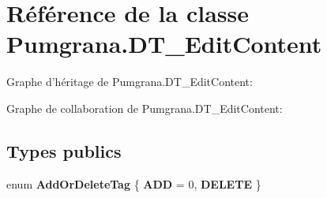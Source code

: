 \hypertarget{class_pumgrana_1_1_d_t___edit_content}{\section{Référence de la classe Pumgrana.\+D\+T\+\_\+\+Edit\+Content}
\label{class_pumgrana_1_1_d_t___edit_content}
}


Graphe d'héritage de Pumgrana.\+D\+T\+\_\+\+Edit\+Content\+:


Graphe de collaboration de Pumgrana.\+D\+T\+\_\+\+Edit\+Content\+:
\subsection*{Types publics}
\begin{DoxyCompactItemize}
\item 
\hypertarget{class_pumgrana_1_1_d_t___edit_content_a25f1a21486df08595b59e44429c363e3}{enum {\bfseries Add\+Or\+Delete\+Tag} \{ {\bfseries A\+D\+D} = 0, 
{\bfseries D\+E\+L\+E\+T\+E}
 \}}\label{class_pumgrana_1_1_d_t___edit_content_a25f1a21486df08595b59e44429c363e3}

\end{DoxyCompactItemize}
